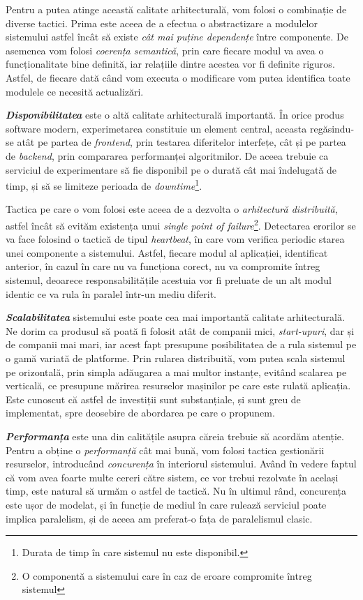 Pentru a putea atinge această calitate arhitecturală, vom folosi o combinație de diverse tactici. Prima este aceea de a efectua o abstractizare a modulelor sistemului astfel încât să existe \textit{cât mai puține dependențe} între componente. De asemenea vom folosi \textit{coerența semantică}, prin care fiecare modul va avea o funcționalitate bine definită, iar relațiile dintre acestea vor fi definite riguros. Astfel, de fiecare dată când vom executa o modificare vom putea identifica toate modulele ce necesită actualizări.

\textbf{\textit{Disponibilitatea}} este o altă calitate arhitecturală importantă. În orice produs software modern, experimetarea constituie un element central, aceasta regăsindu-se atât pe partea de \textit{frontend}, prin testarea diferitelor interfețe, cât și pe partea de \textit{backend}, prin compararea performanței algoritmilor. De aceea trebuie ca serviciul de experimentare să fie disponibil pe o durată cât mai îndelugată de timp, și să se limiteze perioada de \textit{downtime}\footnote{Durata de timp în care sistemul nu este disponibil.}.

Tactica pe care o vom folosi este aceea de a dezvolta o \textit{arhitectură distribuită}, astfel încât să evităm existența unui \textit{single point of failure}\footnote{O componentă a sistemului care în caz de eroare compromite întreg sistemul}. Detectarea erorilor se va face folosind o tactică de tipul \textit{heartbeat}, în care vom verifica periodic starea unei componente a sistemului. Astfel, fiecare modul al aplicației, identificat anterior, în cazul în care nu va funcționa corect, nu va compromite întreg sistemul, deoarece responsabilitățile acestuia vor fi preluate de un alt modul identic ce va rula în paralel într-un mediu diferit.

\textbf{\textit{Scalabilitatea}} sistemului este poate cea mai importantă calitate arhitecturală. Ne dorim ca produsul să poată fi folosit atât de companii mici, \textit{start-upuri}, dar și de companii mai mari, iar acest fapt presupune posibilitatea de a rula sistemul pe o gamă variată de platforme. Prin rularea distribuită, vom putea scala sistemul pe orizontală, prin simpla adăugarea a mai multor instanțe, evitând scalarea pe verticală, ce presupune mărirea resurselor mașinilor pe care este rulată aplicația. Este cunoscut că astfel de investiții sunt substanțiale, și sunt greu de implementat, spre deosebire de abordarea pe care o propunem.

\textbf{\textit{Performanța}} este una din calitățile asupra căreia trebuie să acordăm atenție. Pentru a obține o \textit{performanță} cât mai bună, vom folosi tactica gestionării resurselor, introducând \textit{concurența} în interiorul sistemului. Având în vedere faptul că vom avea foarte multe cereri către sistem, ce vor trebui rezolvate în același timp, este natural să urmăm o astfel de tactică. Nu în ultimul rând, concurența este ușor de modelat, și în funcție de mediul în care rulează serviciul poate implica paralelism, și de aceea am preferat-o fața de paralelismul clasic.

